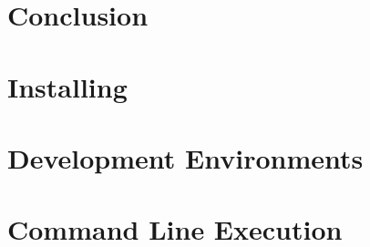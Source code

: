 \documentclass[letterpaper]{article}
\begin{document}
    

    \section{Conclusion}
    \label{Conclusion}

    \newpage{}

    \appendix{}

    \section{Installing \LaTeXe}
    \label{Installing}


    \section{Development Environments}
    \label{Development Environments}


    \section{Command Line Execution}
    \label{Command Line}

    \theendnotes{}
\end{document}
